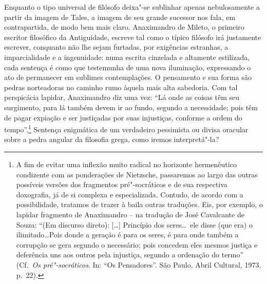 Enquanto o tipo universal de filósofo deixa"-se sublinhar apenas
nebulosamente a partir da imagem de Tales, a imagem de seu grande
sucessor nos fala, em contrapartida, de modo bem mais claro.
Anaximandro de Mileto, o primeiro escritor filosófico da	\label{primeiroescritor}
Antiguidade, escreve tal como o típico filósofo irá justamente
escrever, conquanto não lhe sejam furtadas, por exigências estranhas, a
imparcialidade e a ingenuidade: numa escrita cinzelada e altamente
estilizada, cada sentença é como que testemunha de uma nova iluminação,
expressando o ato de permanecer em sublimes contemplações. O pensamento
e sua forma são pedras norteadoras no caminho rumo àquela mais alta
sabedoria. Com tal perspicácia lapidar, Anaximandro diz uma vez: ``Lá	\label{laondeascoisas}
onde as coisas têm seu surgimento, para lá também devem ir ao fundo,
segundo a necessidade; pois têm de pagar expiação e ser justiçadas por
suas injustiças, conforme a ordem do tempo''.\footnote{ A fim de evitar
uma inflexão muito radical no horizonte hermenêutico condizente com as
ponderações de Nietzsche, passaremos ao largo das outras possíveis
versões dos fragmentos pré"-socráticos e de sua respectiva doxografia,
já de si complexa e especializada. Contudo, de acordo com a
possibilidade, tratamos de trazer à baila outras traduções. Eis, por
exemplo, o lapidar fragmento de Anaximandro -- na tradução de José
Cavalcante de Souza: ``(Em discurso direto): [\ldots] Princípio dos seres\ldots\
ele disse (que era) o ilimitado\ldots Pois donde a geração é para os
seres, é para onde também a corrupção se gera segundo o necessário;
pois concedem eles mesmos justiça e deferência uns aos outros pela
injustiça, segundo a ordenação do termo'' (Cf.~\textit{Os
pré"-socráticos}. In: ``Os Pensadores''. São Paulo, Abril Cultural, 1973,
p.~22).} Sentença enigmática de um verdadeiro pessimista ou
divisa oracular sobre a pedra angular da filosofia grega, como iremos
interpretá"-la?

